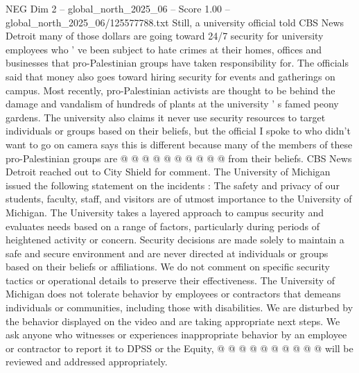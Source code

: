 \begin{textsample}{NEG Dim 2 – global\_north\_2025\_06 – Score 1.00 – global\_north\_2025\_06/125577788.txt}
Still, a university official told CBS News Detroit many of those dollars are going toward 24/7 security for university employees who ' ve been subject to hate crimes at their homes, offices and businesses that pro-Palestinian groups have taken responsibility for.
The officials said that money also goes toward hiring security for events and gatherings on campus.
Most recently, pro-Palestinian activists are thought to be behind the damage and vandalism of hundreds of plants at the university ' s famed peony gardens.
The university also claims it never use security resources to target individuals or groups based on their beliefs, but the official I spoke to who didn't want to go on camera says this is different because many of the members of these pro-Palestinian groups are @ @ @ @ @ @ @ @ @ @ from their beliefs.
CBS News Detroit reached out to City Shield for comment.
The University of Michigan issued the following statement on the incidents : The safety and privacy of our students, faculty, staff, and visitors are of utmost importance to the University of Michigan.
The University takes a layered approach to campus security and evaluates needs based on a range of factors, particularly during periods of heightened activity or concern.
Security decisions are made solely to maintain a safe and secure environment and are never directed at individuals or groups based on their beliefs or affiliations.
We do not comment on specific security tactics or operational details to preserve their effectiveness.
The University of Michigan does not tolerate behavior by employees or contractors that demeans individuals or communities, including those with disabilities.
We are disturbed by the behavior displayed on the video and are taking appropriate next steps.
We ask anyone who witnesses or experiences inappropriate behavior by an employee or contractor to report it to DPSS or the Equity, @ @ @ @ @ @ @ @ @ @ will be reviewed and addressed appropriately.

\end{textsample}
